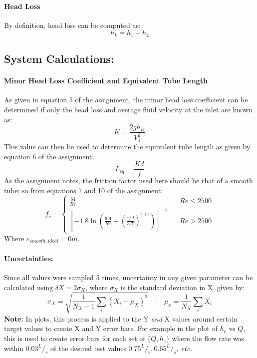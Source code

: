 \documentclass[12pt]{article}
\begin{document}
	\paragraph{Head Loss}
	By definition, head loss can be computed as:
	\begin{equation}
 		h_k = h_1 - h_2
	\end{equation}
	
	\subsection{System Calculations:}
	\paragraph{Minor Head Loss Coefficient and Equivalent Tube Length}
	As given in equation 5 of the assignment, the minor head loss coefficient can be determined if only the head loss and average fluid velocity at the inlet are known as:
	\begin{equation}
		K = \frac{2gh_K}{V_1^2}
	\end{equation}
	This value can then be used to determine the equivalent tube length as given by equation 6 of the assignment:
	\begin{equation}
		L_{eq}=\frac{Kd}{f}
	\end{equation}
	As the assignment notes, the friction factor used here should be that of a smooth tube; so from equations 7 and 10 of the assignment:
	\begin{equation}
		f_c = \left\{
			\begin{array}{ll}
				\frac{64}{Re} & \quad Re \leq 2500 \\
				\left[-1.8\ln\left(\frac{6.9}{Re} + \left(\frac{\varepsilon/d}{3.7}\right)^{1.11}\right)\right]^{-2} & \quad Re>2500
			\end{array}
		\right.
	\end{equation}
	Where $\varepsilon_{smooth,ideal} = 0 m$.
	
	\paragraph{Uncertainties:}
	Since all values were sampled 5 times, uncertainty in any given parameter can be calculated using $\delta X = 2\sigma_X$, where $\sigma_X$ is the standard deviation in X, given by:
	\begin{equation}
		\sigma_X = \sqrt{\frac{1}{N_X-1}\sum_{i} (X_i - \mu_X)^2} \quad | \quad \mu_x=\frac{1}{N_X}\sum_i X_i
	\end{equation}
	\textbf{Note:} In plots, this process is applied to the Y \textit{and} X values around certain target values to create X and Y error bars. \hfill\break For example in the plot of $h_e$ vs $Q$, this is used to create error bars for each set of $\{Q,h_e\}$ where the flow rate was within $0.03^{L}/_{s}$ of the desired test values $0.75^{L}/_{s}, 0.65^{L}/_{s}, \; etc.$
	
\end{document}
